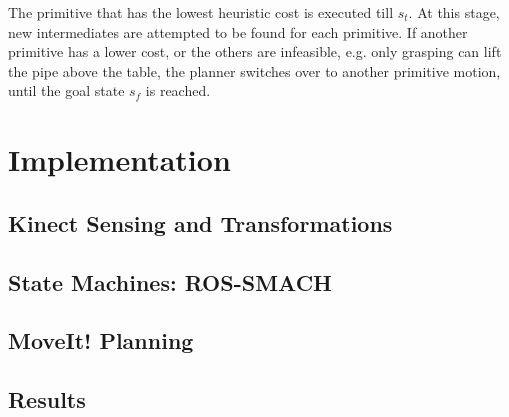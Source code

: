 \documentclass[runningheads,letterpaper]{llncs}
\begin{document}
The primitive that has the lowest heuristic cost is executed till $s_t$. At this stage, new intermediates are attempted to be found for each primitive. If another primitive has a lower cost, or the others are infeasible, e.g. only grasping can lift the pipe above the table, the planner switches over to another primitive motion, until the goal state $s_f$ is reached.


\section{Implementation}

\subsection{Kinect Sensing and Transformations}

\subsection{State Machines: ROS-SMACH}

\subsection{MoveIt! Planning}

\subsection{Results}



\end{document}
